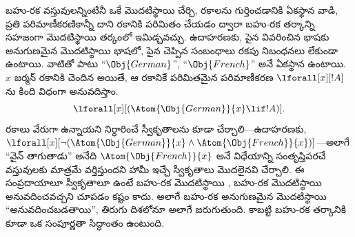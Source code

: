 \documentclass[../../../include/open-logic-section]{subfiles}
\begin{document}
బహు-రక  వస్తువులన్నింటినీ ఒకే మొదటిస్థాయి
 చేర్చి, రకాలను గుర్తించడానికి ఏకస్థాన 
వాడి, ప్రతి పరిమాణీకరణికాన్నీ దాని రకానికి పరిమితం చేయడం ద్వారా బహు-రక తర్కాన్ని సహజంగా
మొదటిస్థాయి తర్కంలో ఇమిడ్చవచ్చు. ఉదాహరణకు, పైన వివరించిన భాషకు
అనుగుణమైన మొదటిస్థాయి భాషలో, పైన చెప్పిన సంబంధాలు రకపు నిబంధనలు లేకుండా
ఉంటాయి. వాటితో పాటు ``$\Obj{German}$'', ``$\Obj{French}$'' అనే
ఏకస్థాన  ఉంటాయి. $x$ జర్మన్ రకానికి చెందిన
 అయితే, ఆ రకానికే పరిమితమైన పరిమాణీకరణ $\lforall[x][!A]$ను
కింది విధంగా అనువదిస్తాం.
\[
\lforall[x][(\Atom{\Obj{German}}{x} \lif !A)].
\]
రకాలు వేరుగా ఉన్నాయని నిర్ధారించే స్వీకృతాలను కూడా చేర్చాలి---ఉదాహరణకు,
$\lforall[x][\lnot (\Atom{\Obj{German}}{x} \land
  \Atom{\Obj{French}}{x})]$---అలాగే ``వైన్ తాగుతాడు'' అనేది
$\Atom{\Obj{French}}{x}$ అనే విధేయాన్ని సంతృప్తిపరచే వస్తువులకు
మాత్రమే వర్తిస్తుందని హామీ ఇచ్చే స్వీకృతాలు మొదలైనవి చేర్చాలి.
ఈ సంప్రదాయాలూ స్వీకృతాలూ ఉంటే బహు-రక  మొదటిస్థాయి
, బహు-రక  మొదటిస్థాయి
 అనువదించవచ్చని చూపడం కష్టం కాదు. అలాగే బహు-రక
 అనుగుణమైన మొదటిస్థాయి 
``అనువదించబడతాయి'', తిరుగు దిశలోనూ అలాగే జరుగుతుంది. కాబట్టి
బహు-రక తర్కానికి కూడా ఒక సంపూర్ణతా సిద్ధాంతం ఉంటుంది.
\end{document}
